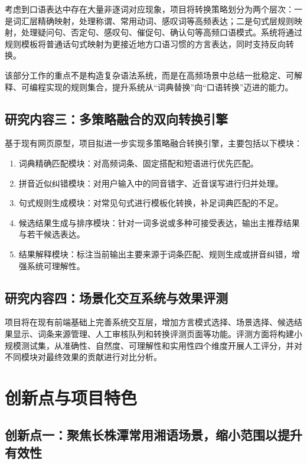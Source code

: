 \documentclass[12pt,a4paper]{ctexart}
\begin{document}
考虑到口语表达中存在大量非逐词对应现象，项目将转换策略划分为两个层次：一是词汇层精确映射，处理称谓、常用动词、感叹词等高频表达；二是句式层规则映射，处理疑问句、否定句、感叹句、催促句、确认句等高频口语模式。系统将通过规则模板将普通话句式映射为更接近地方口语习惯的方言表达，同时支持反向转换。

该部分工作的重点不是构造复杂语法系统，而是在高频场景中总结一批稳定、可解释、可编程实现的规则集合，提升系统从“词典替换”向“口语转换”迈进的能力。

\subsection{研究内容三：多策略融合的双向转换引擎}

基于现有网页原型，项目拟进一步实现多策略融合转换引擎，主要包括以下模块：

\begin{enumerate}
  \item 词典精确匹配模块：对高频词条、固定搭配和短语进行优先匹配。
  \item 拼音近似纠错模块：对用户输入中的同音错字、近音误写进行归并处理。
  \item 句式规则生成模块：对常见句式进行模板化转换，补足词典匹配的不足。
  \item 候选结果生成与排序模块：针对一词多说或多种可接受表达，输出主推荐结果与若干候选表达。
  \item 结果解释模块：标注当前输出主要来源于词条匹配、规则生成或拼音纠错，增强系统可理解性。
\end{enumerate}

\subsection{研究内容四：场景化交互系统与效果评测}

项目将在现有前端基础上完善系统交互层，增加方言模式选择、场景选择、候选结果显示、词条来源管理、人工审核队列和转换评测页面等功能。评测方面将构建小规模测试集，从准确性、自然度、可理解性和实用性四个维度开展人工评分，并对不同模块对最终效果的贡献进行对比分析。

\section{创新点与项目特色}

\subsection{创新点一：聚焦长株潭常用湘语场景，缩小范围以提升有效性}
\end{document}
